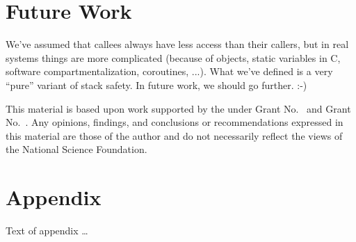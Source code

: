 \documentclass[acmsmall,review,anonymous]{acmart}\settopmatter{printfolios=true,printccs=false,printacmref=false}
\begin{document}

\section{Future Work}

We've assumed that callees always have less access than their callers, but
in real systems things are more complicated (because of objects, static
variables in C, software compartmentalization, coroutines, ...).  What we've
defined is a very ``pure'' variant of stack safety.  In future work, we
should go further. :-)


\begin{acks}                            %
  This material is based upon work supported by the
   under Grant
  No.~ and Grant
  No.~.  Any opinions, findings, and
  conclusions or recommendations expressed in this material are those
  of the author and do not necessarily reflect the views of the
  National Science Foundation.
\end{acks}


%


\appendix
\section{Appendix}

Text of appendix \ldots
\end{document}
